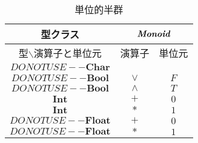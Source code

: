 \documentclass[a5paper,draft]{jsbook}
\newcommand{\mathTypeParameter}[1]{\mathbf{#1}}
\newcommand{\mathTypeName}[1]{\mathbf{#1}}
\newcommand{\mathTypeClass}[1]{\textbf{\emph{#1}}} %
\newcommand{\hsklBool}{{DO NOT USE}--\mathTypeParameter{Bool}}
\newcommand{\hsklChar}{{DO NOT USE}--\mathTypeParameter{Char}}
\newcommand{\hsklFloat}{{DO NOT USE}--\mathTypeParameter{Float}}
\begin{document}
\begin{table}
\caption{単位的半群}
\label{tab:monoids}
\begin{center}
\begin{tabular}{||c||c|c||}
\hline
型クラス
    &\multicolumn{2}{|c||}{$\mathTypeClass{Monoid}$}\\
\hline\hline
型$\backslash$演算子と単位元
    &演算子
    &単位元\\
\hline
$\hsklChar$
    &
    &\\
\hline
$\hsklBool$
    &$\vee$
    &$F$\\
\hline
$\hsklBool$
    &$\wedge$
    &$T$\\
\hline
$\mathTypeName{Int}$
    &$+$
    &$0$\\
\hline
$\mathTypeName{Int}$
    &$*$
    &$1$\\
\hline
$\hsklFloat$
    &$+$
    &$0$\\
\hline
$\hsklFloat$
    &$*$
    &$1$\\
\hline
\end{tabular}
\end{center}
\end{table}
\end{document}
